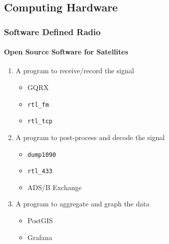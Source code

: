 \documentclass[aspectratio=169]{beamer}
\begin{document}
\subsection{Computing Hardware}
\begin{frame}[fragile]
    \frametitle{Software Defined Radio}
    \framesubtitle{Open Source Software for Satellites}
    \begin{enumerate}
        \item A program to receive/record the signal
            \begin{itemize}
                \item GQRX
                \item \verb|rtl_fm|
                \item \verb|rtl_tcp|
            \end{itemize}
        \item A program to post-process and decode the signal
            \begin{itemize}
                \item \verb|dump1090|
                \item \verb|rtl_433|
                \item ADS/B Exchange
            \end{itemize}
        \item A program to aggregate and graph the data
            \begin{itemize}
                \item PostGIS
                \item Grafana
            \end{itemize}
    \end{enumerate}
\end{frame}
\end{document}
